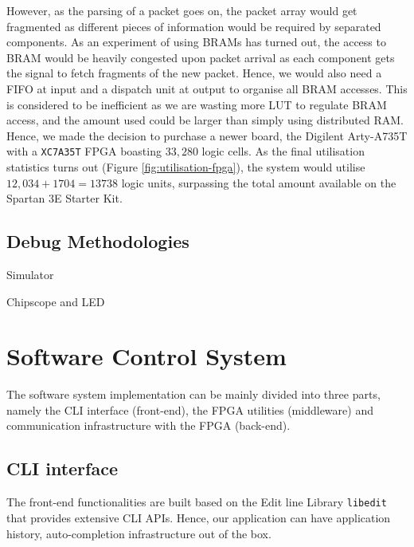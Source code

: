 \documentclass[a4paper]{report}
\newcommand{\code}{\texttt}
\begin{document}
However, as the parsing of a packet goes on, the packet array would get fragmented as different pieces of information would be required by separated components. As an experiment of using BRAMs has turned out, the access to BRAM would be heavily congested upon packet arrival as each component gets the signal to fetch fragments of the new packet. Hence, we would also need a FIFO at input and a dispatch unit at output to organise all BRAM accesses. This is considered to be inefficient as we are wasting more LUT to regulate BRAM access, and the amount used could be larger than simply using distributed RAM. Hence, we made the decision to purchase a newer board, the Digilent Arty-A735T with a \code{XC7A35T} FPGA boasting $33,280$ logic cells\cite{xilinx-documentation-artix}. As the final utilisation statistics turns out (Figure \ref{fig:utilisation-fpga}), the system would utilise $12,034 + 1704 = 13738$ logic units, surpassing the total amount available on the Spartan 3E Starter Kit.

\subsection{Debug Methodologies}

Simulator

Chipscope and LED

\newpage


\section{Software Control System}

The software system implementation can be mainly divided into three parts, namely the CLI interface (front-end), the FPGA utilities (middleware) and communication infrastructure with the FPGA (back-end).

\subsection{CLI interface}

The front-end functionalities are built based on the Edit line Library \code{libedit} that provides extensive CLI APIs. Hence, our application can have application history, auto-completion infrastructure out of the box.
\end{document}

